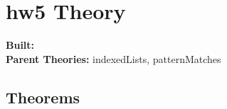\documentclass[11pt, twoside]{article}
\begin{document}


\tableofcontents
\cleardoublepage
\HOLpagestyle

\section{hw5 Theory}
\begin{flushleft}
\textbf{Built:} \HOLhwFiveDate \\[2pt]
\textbf{Parent Theories:} indexedLists, patternMatches
\end{flushleft}



\subsection{Theorems}

\HOLhwFiveTheorems

\HOLindex
\end{document}
